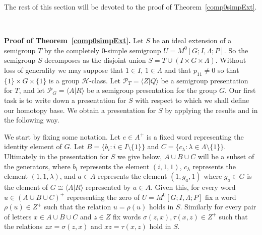 \documentclass[11pt]{amsart}
\theoremstyle{plain}
\begin{document}
The rest of this section will be devoted to the proof of Theorem~\ref{comp0simpExt}.

\

\noindent \textbf{Proof of Theorem~\ref{comp0simpExt}.} Let $S$ be an ideal extension of a semigroup $T$ by the completely $0$-simple semigroup $U = M^0[G;I,\Lambda;P]$. So the semigroup $S$ decomposes as the disjoint union $S = T \cup (I \times G \times \Lambda)$. Without loss of generality we may suppose that $1 \in I$, $1 \in \Lambda$ and that $p_{1 1} \neq 0$ so that $\{ 1 \} \times G \times \{ 1 \}$ is a group ${\mathcal{H}}$-class. Let $\mathcal{P}_T = {\langle} Z | Q {\rangle}$ be a semigroup presentation for $T$, and let $\mathcal{P}_G = {\langle} A | R {\rangle}$ be a semigroup presentation for the group $G$. Our first task is to write down a presentation for $S$ with respect to which we shall define our homotopy base. We obtain a presentation for $S$ by applying the results \cite[Theorem~6.2]{HowieAndRuskuc} and \cite[Proposition~4.4]{Ruskuc2} in the following way.

We start by fixing some notation. Let $e \in A^+$ is a fixed word representing the identity element of $G$. Let $B = \{ b_i : i \in I \setminus \{ 1 \} \}$ and $C = \{ c_{\lambda} : \lambda \in \Lambda \setminus \{ 1 \}  \}$. Ultimately in the presentation for $S$ we give below, $A \cup B \cup C$ will be a subset of the generators, where $b_i$ represents the element $(i,1,1)$, $c_{\lambda}$ represents the element $(1,1,\lambda)$, and $a \in A$ represents the element $(1,g_a,1)$ where $g_a \in G$ is the element of $G \cong {\langle} A  | R {\rangle}$ represented by $a \in A$. Given this, for every word $u \in (A \cup B \cup C)^+$ representing the zero of $U = M^0[G; I, \Lambda;P]$ fix a word $\rho(u) \in Z^+$ such that the relation $u = \rho(u)$ holds in $S$. Similarly for every pair of letters $x \in A \cup B \cup C$ and $z \in Z$ fix words $\sigma(z,x), \tau(x,z) \in Z^+$ such that the relations $zx = \sigma(z,x)$ and $xz = \tau(x,z)$ hold in $S$.
\end{document}

